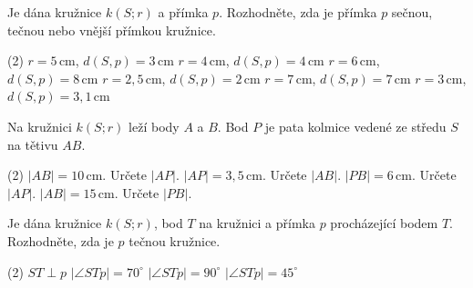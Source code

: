 \documentclass[12pt,a4paper]{article}
\begin{document}

\begin{exercise}

    Je dána kružnice $k(S;r)$ a přímka $p$. Rozhodněte, zda je přímka $p$
    sečnou, tečnou nebo vnější přímkou kružnice.

    \begin{tasks}(2)
        \task $r=5\,\mathrm{cm}$, $d(S,p)=3\,\mathrm{cm}$
        \task $r=4\,\mathrm{cm}$, $d(S,p)=4\,\mathrm{cm}$
        \task $r=6\,\mathrm{cm}$, $d(S,p)=8\,\mathrm{cm}$
        \task $r=2{,}5\,\mathrm{cm}$, $d(S,p)=2\,\mathrm{cm}$
        \task $r=7\,\mathrm{cm}$, $d(S,p)=7\,\mathrm{cm}$
        \task $r=3\,\mathrm{cm}$, $d(S,p)=3{,}1\,\mathrm{cm}$
    \end{tasks}

\end{exercise}



\begin{exercise}

    Na kružnici $k(S;r)$ leží body $A$ a $B$. Bod $P$ je pata kolmice
    vedené ze středu $S$ na tětivu $AB$.

    \begin{tasks}(2)
        \task $|AB|=10\,\mathrm{cm}$. Určete $|AP|$.
        \task $|AP|=3{,}5\,\mathrm{cm}$. Určete $|AB|$.
        \task $|PB|=6\,\mathrm{cm}$. Určete $|AP|$.
        \task $|AB|=15\,\mathrm{cm}$. Určete $|PB|$.
    \end{tasks}

\end{exercise}



\begin{exercise}

    Je dána kružnice $k(S;r)$, bod $T$ na kružnici a přímka $p$ procházející bodem $T$.
    Rozhodněte, zda je $p$ tečnou kružnice.

    \begin{tasks}(2)
        \task $ST\perp p$
        \task $|\angle STp|=70^\circ$
        \task $|\angle STp|=90^\circ$
        \task $|\angle STp|=45^\circ$
    \end{tasks}

\end{exercise}
\end{document}
